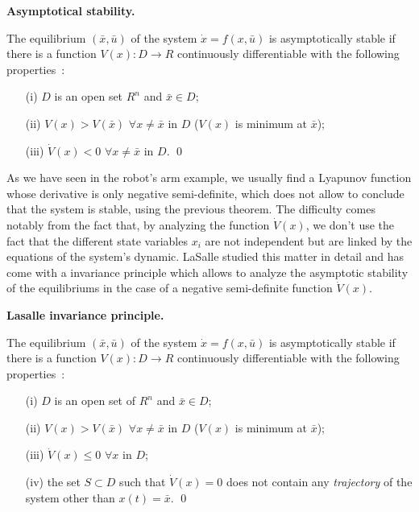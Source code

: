 \begin{theoreme}\label{stabasymp}{\bf Asymptotical stability.}

The equilibrium $(\bar x, \bar u)$ of the system $\dot x = f(x,\bar u)$ is asymptotically stable if there is a function $V(x): D \rightarrow R$ continuously differentiable with the following properties~:\\
\begin{itemize}
\item[(i)] $D$ is an open set $R^n$ and $\bar x \in D$;\\
\item[(ii)] $V(x) > V(\bar x)$ $\forall x \neq \bar x$ in $D$ ($V(x)$ is minimum at $\bar x$);\\
\item[(iii)] $\dot V(x) < 0$ $\forall x \neq \bar x$ in $D$. \qed
\end{itemize}
\end{theoreme}

As we have seen in the robot's arm example, we usually find a Lyapunov function whose derivative is only negative semi-definite, which does not allow to conclude that the system is stable, using the previous theorem.  The difficulty comes notably from the fact that, by analyzing the function $\dot V(x)$, we don't use the fact that the different state variables $x_i$ are not independent but are linked by the equations of the system's dynamic. LaSalle studied this matter in detail and has come with a invariance principle which allows to analyze the asymptotic stability of the equilibriums in the case of a negative semi-definite function $\dot V(x)$.
\newpage
\begin{theoreme}\label{lasalle}{\bf Lasalle invariance principle.}

The equilibrium $(\bar x, \bar u)$ of the system $\dot x = f(x,\bar u)$ is asymptotically stable if there is a function $V(x): D \rightarrow R$ continuously differentiable with the following properties~:\\
\begin{itemize}
\item[(i)] $D$ is an open set of $R^n$ and $\bar x \in D$;\\
\item[(ii)] $V(x) > V(\bar x)$ $\forall x \neq \bar x$ in $D$ ($V(x)$ is minimum at $\bar x$);\\
\item[(iii)] $\dot V(x) \leq 0$ $\forall x$ in  $D$;\\
\item[(iv)] the set $S \subset D$ such that $\dot V(x) = 0$ does not contain any {\em trajectory} of the system other than $x(t) = \bar x$. \qed
\end{itemize}
\end{theoreme}

